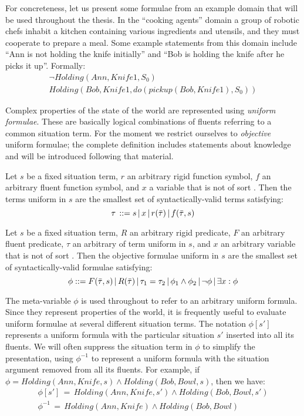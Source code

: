 \medskip{}


For concreteness, let us present some formulae from an example domain
that will be used throughout the thesis. In the {}``cooking agents''
domain a group of robotic chefs inhabit a kitchen containing various
ingredients and utensils, and they must cooperate to prepare a meal.
Some example statements from this domain include {}``Ann is not holding
the knife initially'' and {}``Bob is holding the knife after he
picks it up''. Formally:\begin{gather*}
\neg Holding(Ann,Knife1,S_{0})\\
Holding(Bob,Knife1,do(pickup(Bob,Knife1),S_{0}))\end{gather*}


\medskip{}


Complex properties of the state of the world are represented using
\emph{uniform formulae}. These are basically logical combinations
of fluents referring to a common situation term. For the moment we
restrict ourselves to \emph{objective} uniform formulae; the complete
definition includes statements about knowledge and will be introduced
following that material.

\begin{defnL}
 Let $s$ be a fixed situation term, $r$
an arbitrary rigid function symbol, $f$ an arbitrary fluent function
symbol, and $x$ a variable that is not of sort .
Then the terms uniform in $s$ are the smallest set of syntactically-valid
terms satisfying:\[
\tau\,::=s\,|\, x\,|\, r(\bar{\tau})\,|\, f(\bar{\tau},s)\]

\begin{defnL}
 Let $s$ be a fixed situation
term, $R$ an arbitrary rigid predicate, $F$ an arbitrary fluent
predicate, $\tau$ an arbitrary of term uniform in $s$, and $x$
an arbitrary variable that is not of sort . Then the
objective formulae uniform in $s$ are the smallest set of syntactically-valid
formulae satisfying:\[
\phi::=F(\bar{\tau},s)\,|\, R(\bar{\tau})\,|\,\tau_{1}=\tau_{2}\,|\,\phi_{1}\wedge\phi_{2}\,|\,\neg\phi\,|\,\exists x:\phi\]

\end{defnL}
\end{defnL}
The meta-variable $\phi$ is used throughout to refer to an arbitrary
uniform formula. Since they represent properties of the world, it
is frequently useful to evaluate uniform formulae at several different
situation terms. The notation $\phi[s']$ represents a uniform formula
with the particular situation $s'$ inserted into all its fluents.
We will often suppress the situation term in $\phi$ to simplify the
presentation, using $\phi^{-1}$ to represent a uniform formula with
the situation argument removed from all its fluents. For example,
if $\phi=Holding(Ann,Knife,s)\wedge Holding(Bob,Bowl,s)$, then we
have:\begin{gather*}
\phi[s']\,=\, Holding(Ann,Knife,s')\wedge Holding(Bob,Bowl,s')\\
\phi^{-1}\,=\, Holding(Ann,Knife)\wedge Holding(Bob,Bowl)\end{gather*}


